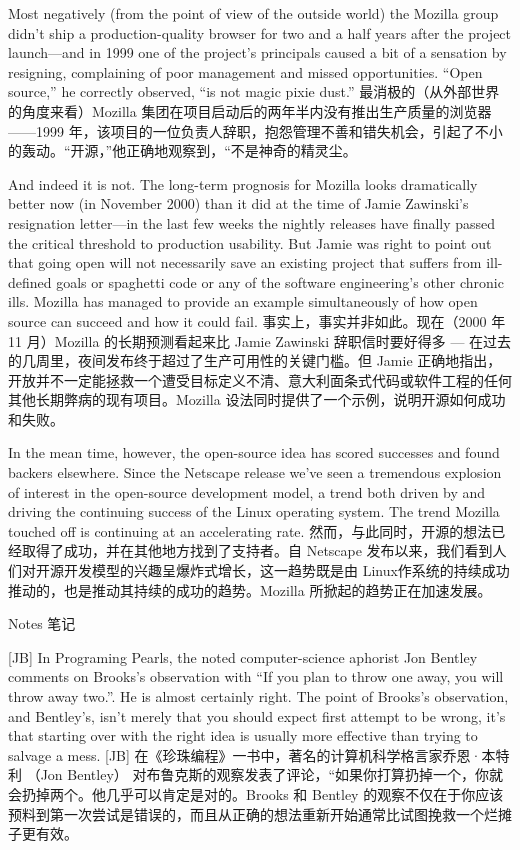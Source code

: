 \documentclass[a4paper,12pt,UTF8,twoside]{ctexbook}
\begin{document}
Most negatively (from the point of view of the outside world) the Mozilla group didn't ship a production-quality browser for two and a half years after the project launch—and in 1999 one of the project's principals caused a bit of a sensation by resigning, complaining of poor management and missed opportunities. ``Open source,'' he correctly observed, ``is not magic pixie dust.''
最消极的（从外部世界的角度来看）Mozilla 集团在项目启动后的两年半内没有推出生产质量的浏览器——1999 年，该项目的一位负责人辞职，抱怨管理不善和错失机会，引起了不小的轰动。“开源，”他正确地观察到，“不是神奇的精灵尘。

And indeed it is not. The long-term prognosis for Mozilla looks dramatically better now (in November 2000) than it did at the time of Jamie Zawinski's resignation letter—in the last few weeks the nightly releases have finally passed the critical threshold to production usability. But Jamie was right to point out that going open will not necessarily save an existing project that suffers from ill-defined goals or spaghetti code or any of the software engineering's other chronic ills. Mozilla has managed to provide an example simultaneously of how open source can succeed and how it could fail.
事实上，事实并非如此。现在（2000 年 11 月）Mozilla 的长期预测看起来比 Jamie Zawinski 辞职信时要好得多 — 在过去的几周里，夜间发布终于超过了生产可用性的关键门槛。但 Jamie 正确地指出，开放并不一定能拯救一个遭受目标定义不清、意大利面条式代码或软件工程的任何其他长期弊病的现有项目。Mozilla 设法同时提供了一个示例，说明开源如何成功和失败。

In the mean time, however, the open-source idea has scored successes and found backers elsewhere. Since the Netscape release we've seen a tremendous explosion of interest in the open-source development model, a trend both driven by and driving the continuing success of the Linux operating system. The trend Mozilla touched off is continuing at an accelerating rate.
然而，与此同时，开源的想法已经取得了成功，并在其他地方找到了支持者。自 Netscape 发布以来，我们看到人们对开源开发模型的兴趣呈爆炸式增长，这一趋势既是由 Linux作系统的持续成功推动的，也是推动其持续的成功的趋势。Mozilla 所掀起的趋势正在加速发展。

Notes  笔记

[JB] In Programing Pearls, the noted computer-science aphorist Jon Bentley comments on Brooks's observation with ``If you plan to throw one away, you will throw away two.''. He is almost certainly right. The point of Brooks's observation, and Bentley's, isn't merely that you should expect first attempt to be wrong, it's that starting over with the right idea is usually more effective than trying to salvage a mess.
[JB] 在《珍珠编程》一书中，著名的计算机科学格言家乔恩·本特利 （Jon Bentley） 对布鲁克斯的观察发表了评论，“如果你打算扔掉一个，你就会扔掉两个。他几乎可以肯定是对的。Brooks 和 Bentley 的观察不仅在于你应该预料到第一次尝试是错误的，而且从正确的想法重新开始通常比试图挽救一个烂摊子更有效。
\end{document}
